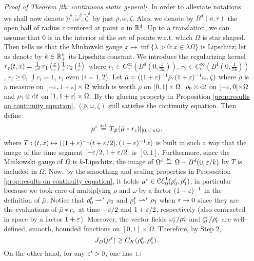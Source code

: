 \begin{proof}[Proof of Theorem \ref{th: continuous static general}]
In order to alleviate notations we shall now denote $\tilde{\rho}^{\delta} ,  \tilde{\omega}^{\delta}, \tilde{\zeta}^{\delta} $ by just $\rho, \omega, \zeta$. Also, we denote by $B^d(a,r)$ the open ball of radius $r$ centered at point $a$ in $\mathbb{R}^d$.
%
Up to a translation, we can assume that $0$ is in the interior of the set of points w.r.t. which $\Omega$ is star shaped. Then \cite[Theorem 5.3]{rubinov2013abstract} tells us that the Minkowski gauge $x \mapsto \inf \{ \lambda>0 : x \in \lambda \Omega \}$ is Lipschitz; let us denote by $k\in \mathbb{R}_+^*$ its Lipschitz constant.
%
We introduce the regularizing kernel
$
r_{\varepsilon}(t,x) = \frac{1}{\varepsilon^{d}}\, r_1\left( \frac{x}{\varepsilon} \right) \frac{1}{\varepsilon}\, r_2 \left( \frac{t}{\varepsilon} \right) \, 
$
where $r_1 \in C_c^{\infty}(B^d(0,\frac{1}{2k}))$, $r_2 \in C_c^{\infty}(B^1(0,\frac{1}{2k}))$, $r_i \geq 0$, $\int r_i = 1$, $r_i$ even ($i=1,2$). Let $\bar{\mu}=((1+\varepsilon)^{-1}\bar{\rho},(1+\varepsilon)^{-1}\omega,\zeta)$ where $\bar{\rho}$ is a measure on $[-\varepsilon,1+\varepsilon]\times \Omega$ which is worth $\rho$ on $[0,1]\times \Omega$,  $\rho_0 \otimes \mathrm{d} t$ on $[-\varepsilon,0[\times \Omega$ and $\rho_1 \otimes \mathrm{d} t$ on $]1,1+\varepsilon]\times \Omega$. By the glueing property in Proposition \ref{prop:results on continuity equation}, $(\bar{\rho},\omega,\zeta)$ still satisfies the continuity equation. Then define
\[
\mu^\varepsilon \stackrel{\mbox{\upshape\tiny def.}}{=} T_{\#} (\bar{\mu} \ast r_\varepsilon)\vert_{[0,1]\times \Omega},
\]
where $T:(t,x) \mapsto ((1+\varepsilon)^{-1}(t+ \varepsilon/2),(1+\varepsilon)^{-1}x)$ is built in such a way that the image of the time segment $[-\varepsilon/2,1+\varepsilon/2]$ is $[0,1]$. Furthermore, since the Minkowski gauge of $\Omega$ is $k$-Lipschitz, the image of $\Omega^\varepsilon \stackrel{\mbox{\upshape\tiny def.}}{=} \Omega + B^d(0,\varepsilon/k)$ by $T$ is included in $\Omega$. Now, by the smoothing and scaling properties in Proposition \ref{prop:results on continuity equation}, it holds $\mu^{\varepsilon} \in \mathcal{CE}_0^1(\rho^{\varepsilon}_0,\rho^{\varepsilon}_1)$,  in particular because we took care of multiplying $\rho$ and $\omega$ by a factor $(1+\varepsilon)^{-1}$ in the definition of $\bar{\mu}$. Notice that $\rho^{\varepsilon}_0 \rightharpoonup^* \rho_0$ and $\rho^{\varepsilon}_1 \rightharpoonup^* \rho_1$ when $\varepsilon \to 0$ since they are the evaluations of $\bar{\mu}\ast r_\varepsilon$ at time $-\varepsilon/2$ and $1+\varepsilon/2$, respectively (also contracted in space by a factor $1+\varepsilon$). Moreover, the vector fields $\omega_t^{\varepsilon}/ \rho_t^{\varepsilon}$ and $\zeta_t^{\varepsilon}/ \rho_t^{\varepsilon}$ are well-defined, smooth, bounded functions on $[0,1]\times \Omega$. Therefore, by Step 2,
\[
J_D(\mu^{\varepsilon}) \geq C_K(\rho_0^{\varepsilon}, \rho_1^{\varepsilon}).
\]
On the other hand, for any $\varepsilon'>0$, one has

\end{proof}

